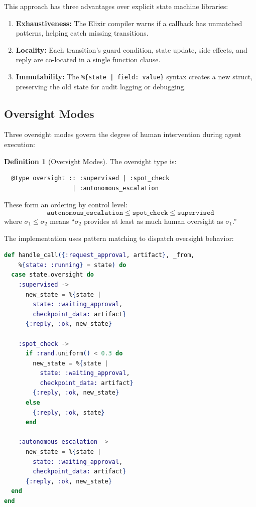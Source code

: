 \documentclass[12pt,a4paper]{article}
\theoremstyle{definition}
\newtheorem{definition}[theorem]{Definition}
\theoremstyle{remark}
\begin{document}
This approach has three advantages over explicit state machine libraries:

\begin{enumerate}[leftmargin=2em]
  \item \textbf{Exhaustiveness:} The Elixir compiler warns if a callback has unmatched patterns, helping catch missing transitions.
  \item \textbf{Locality:} Each transition's guard condition, state update, side effects, and reply are co-located in a single function clause.
  \item \textbf{Immutability:} The \texttt{\%\{state | field: value\}} syntax creates a new struct, preserving the old state for audit logging or debugging.
\end{enumerate}

\subsection{Oversight Modes}

Three oversight modes govern the degree of human intervention during agent execution:

\begin{definition}[Oversight Modes]\label{def:oversight}
The oversight type is:
\begin{verbatim}
  @type oversight :: :supervised | :spot_check
                   | :autonomous_escalation
\end{verbatim}
These form an ordering by control level:
\[
  \texttt{autonomous\_escalation} \leq \texttt{spot\_check} \leq \texttt{supervised}
\]
where $\sigma_1 \leq \sigma_2$ means ``$\sigma_2$ provides at least as much human oversight as $\sigma_1$.''
\end{definition}

The implementation uses pattern matching to dispatch oversight behavior:

\begin{lstlisting}[language=elixir, caption={Oversight mode dispatch via pattern matching (from \texttt{agent.ex})}, label={lst:oversight}]
def handle_call({:request_approval, artifact}, _from,
    %{state: :running} = state) do
  case state.oversight do
    :supervised ->
      new_state = %{state |
        state: :waiting_approval,
        checkpoint_data: artifact}
      {:reply, :ok, new_state}

    :spot_check ->
      if :rand.uniform() < 0.3 do
        new_state = %{state |
          state: :waiting_approval,
          checkpoint_data: artifact}
        {:reply, :ok, new_state}
      else
        {:reply, :ok, state}
      end

    :autonomous_escalation ->
      new_state = %{state |
        state: :waiting_approval,
        checkpoint_data: artifact}
      {:reply, :ok, new_state}
  end
end
\end{lstlisting}
\end{document}
